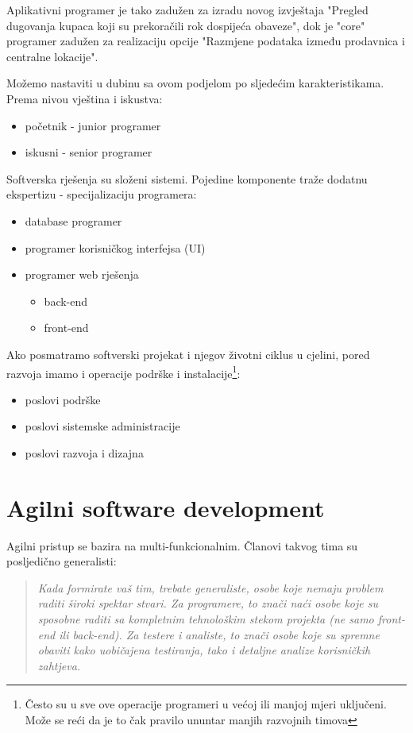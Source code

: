 \documentclass[times, utf8, seminar]{fit}
\begin{document}
Aplikativni programer je tako zadužen za izradu novog izvještaja "Pregled dugovanja kupaca koji su prekoračili rok dospijeća obaveze",  dok je "core" programer zadužen za realizaciju opcije "Razmjene podataka između prodavnica i centralne lokacije".  

Možemo nastaviti u dubinu sa ovom podjelom po sljedećim karakteristikama. Prema nivou vještina i iskustva: 
\begin{itemize}
  \item početnik - junior programer
  \item iskusni - senior programer
\end{itemize}

Softverska rješenja su složeni sistemi. Pojedine komponente traže dodatnu ekspertizu - specijalizaciju programera:
\begin{itemize}
  \item database programer
  \item programer korisničkog interfejsa (UI)
  \item programer web rješenja
     \begin{itemize}
          \item back-end
          \item front-end
      \end{itemize}
\end{itemize}

Ako posmatramo softverski projekat i njegov životni ciklus u cjelini, pored razvoja imamo i operacije podrške i instalacije\footnote{Često su u sve ove operacije programeri u većoj ili manjoj mjeri uključeni. Može se reći da je to čak pravilo ununtar manjih razvojnih timova}: 
\begin{itemize}
   \item poslovi podrške
   \item poslovi sistemske administracije
   \item poslovi razvoja i dizajna
\end{itemize}

\section{Agilni software development}

Agilni pristup se bazira na multi-funkcionalnim. Članovi takvog tima su posljedično generalisti\citep[str. 19]{agilesamurai}:

\begin{quote}
\emph{Kada formirate vaš tim, trebate generaliste, osobe koje nemaju problem raditi široki spektar stvari. Za programere, to znači naći osobe koje su sposobne raditi sa kompletnim tehnološkim stekom projekta (ne samo front-end ili back-end). Za testere i analiste, to znači osobe koje su spremne obaviti kako uobičajena testiranja, tako i detaljne analize korisničkih zahtjeva.}
\end{quote}
\end{document}
